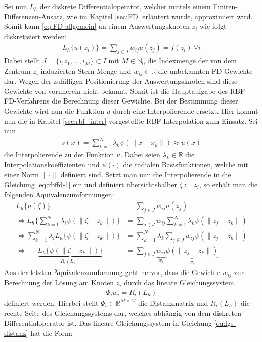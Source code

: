 \documentclass[12pt,titlepage]{article}
\begin{document}
Sei nun $L_h$ der diskrete Differentialoperator, welcher mittels einem Finiten-Differenzen-Ansatz, wie im Kapitel \ref{sec:FD} erläutert wurde, approximiert wird. Somit kann \eqref{eq:FD-allgemein} an einem Auswertungsknoten $z_i$ wie folgt diskretisiert werden:
\begin{align}
 L_h\{u(z_i)\}=\sum_{j\in J}w_{ij}u(z_j)=f(z_i)~\forall i\label{eq:rbffd-1}
\end{align}
Dabei stellt $J=\{i,i_1,\dots,i_M\}\subset I$ mit $M\in\mathbb{N}_0$ die Indexmenge der von dem Zentrum $z_i$ induzierten Stern-Menge und $w_{ij}\in\mathbb{R}$ die unbekannten FD-Gewichte dar. Wegen der zufälligen Positionierung der Auswertungsknoten sind diese Gewichte von vornherein nicht bekannt. Somit ist die Hauptaufgabe des RBF-FD-Verfahrens die Berechnung dieser Gewichte. Bei der Bestimmung dieser Gewichte wird nun die Funktion $u$ durch eine Interpolierende ersetzt. Hier kommt nun die in Kapitel \ref{sec:rbf_inter} vorgestellte RBF-Interpolation zum Einsatz. Sei nun
\begin{align}
 s(x)=\sum_{k=1}^N\lambda_k\psi(\|x-x_k\|)\approx u(x)
\end{align}
die Interpolierende zu der Funktion $u$. Dabei seien $\lambda_k\in\mathbb{R}$ die Interpolationskoeffizienten und $\psi(\cdot)$ die radialen Basisfunktionen, welche mit einer Norm $\|\cdot\|$ definiert sind. Setzt man nun die Interpolierende in die Gleichung \eqref{eq:rbffd-1} ein und definiert übersichtshalber $\zeta:=z_i$, so erhält man die folgenden Äquivalenzumformungen:
\begin{align}
  L_h\{u(\zeta)\}&=\sum_{j\in J}w_{ij}u(z_j)\\
\Leftrightarrow L_h\{\sum_{k=1}^N\lambda_i\psi(\|\zeta-z_k\|)\}&=\sum_{j\in J}w_{ij}\sum_{k=1}^N\lambda_k\psi(\|z_j-z_k\|)\\
\Leftrightarrow \sum_{k=1}^N\lambda_iL_h\{\psi(\|\zeta-z_k\|)\}&=\sum_{k=1}^N\lambda_k\sum_{j\in J}w_{ij}\psi(\|z_j-z_k\|)\\
\Leftrightarrow~~~~~~~ \underbrace{L_h\{\psi(\|\zeta-z_k\|)\}}_{R_i(L_h)}&=\sum_{j\in J}\underbrace{w_{ij}}_{w_i}\underbrace{\psi(\|z_j-z_k\|)}_{\Psi_i}
\end{align}
Aus der letzten Äquivalenzumformung geht hervor, dass die Gewichte $w_{ij}$ zur Berechnung der Lösung am Knoten $z_i$ durch das lineare Gleichungssystem
\begin{align}
 \Psi_i w_i=R_i(L_h)\label{eq:lgs-distanz}
\end{align}
definiert werden. Hierbei stellt $\Psi_i\in\mathbb{R}^{M\times M}$ die Distanzmatrix und $R_i(L_h)$ die rechte Seite des Gleichungssystems dar, welches abhängig von dem diskreten Differentialoperator ist. Das lineare Gleichungssystem in  Gleichung \eqref{eq:lgs-distanz} hat die Form:
\end{document}

